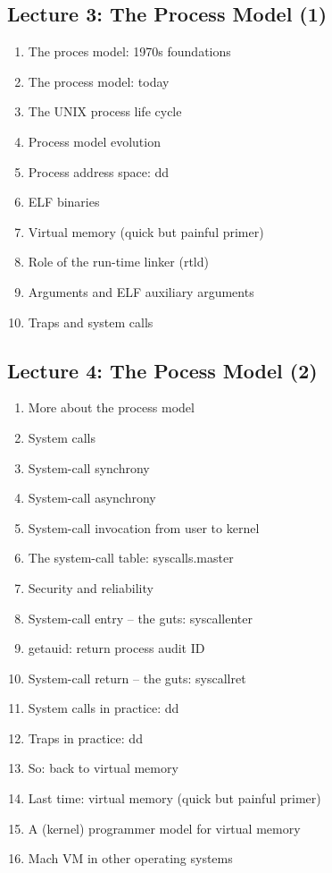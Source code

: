 \documentclass[a4paper,10pt]{article}
\begin{document}
\subsection*{Lecture 3: The Process Model (1)}

\begin{enumerate}
  \item The proces model: 1970s foundations
  \item The process model: today
  \item The UNIX process life cycle
  \item Process model evolution
  \item Process address space: dd
  \item ELF binaries
  \item Virtual memory (quick but painful primer)
  \item Role of the run-time linker (rtld)
  \item Arguments and ELF auxiliary arguments
  \item Traps and system calls
\end{enumerate}

\subsection*{Lecture 4: The Pocess Model (2)}

\begin{enumerate}
  \item More about the process model
  \item System calls
  \item System-call synchrony
  \item System-call asynchrony
  \item System-call invocation from user to kernel
  \item The system-call table: syscalls.master
  \item Security and reliability
  \item System-call entry -- the guts: syscallenter
  \item getauid: return process audit ID
  \item System-call return -- the guts: syscallret
  \item System calls in practice: dd
  \item Traps in practice: dd
  \item So: back to virtual memory
  \item Last time: virtual memory (quick but painful primer)
  \item A (kernel) programmer model for virtual memory
  \item Mach VM in other operating systems
\end{enumerate}
\end{document}
